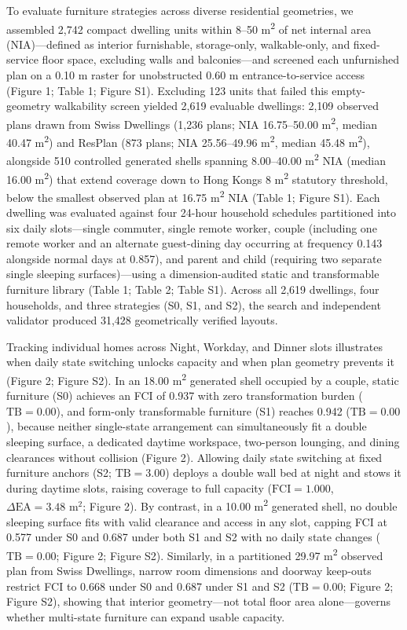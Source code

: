 \documentclass[12pt,letterpaper]{article}
\begin{document}
To evaluate furniture strategies across diverse residential geometries, we assembled 2,742 compact dwelling units within 8--50 m\textsuperscript{2} of net internal area (NIA)---defined as interior furnishable, storage-only, walkable-only, and fixed-service floor space, excluding walls and balconies---and screened each unfurnished plan on a 0.10 m raster for unobstructed 0.60 m entrance-to-service access (Figure 1; Table 1; Figure S1). Excluding 123 units that failed this empty-geometry walkability screen yielded 2,619 evaluable dwellings: 2,109 observed plans drawn from Swiss Dwellings (1,236 plans; NIA 16.75--50.00 m\textsuperscript{2}, median 40.47 m\textsuperscript{2}) and ResPlan (873 plans; NIA 25.56--49.96 m\textsuperscript{2}, median 45.48 m\textsuperscript{2}), alongside 510 controlled generated shells spanning 8.00--40.00 m\textsuperscript{2} NIA (median 16.00 m\textsuperscript{2}) that extend coverage down to Hong Kong\textquotesingle s 8 m\textsuperscript{2} statutory threshold, below the smallest observed plan at 16.75 m\textsuperscript{2} NIA (Table 1; Figure S1). Each dwelling was evaluated against four 24-hour household schedules partitioned into six daily slots---single commuter, single remote worker, couple (including one remote worker and an alternate guest-dining day occurring at frequency 0.143 alongside normal days at 0.857), and parent and child (requiring two separate single sleeping surfaces)---using a dimension-audited static and transformable furniture library (Table 1; Table 2; Table S1). Across all 2,619 dwellings, four households, and three strategies (S0, S1, and S2), the search and independent validator produced 31,428 geometrically verified layouts.

Tracking individual homes across Night, Workday, and Dinner slots illustrates when daily state switching unlocks capacity and when plan geometry prevents it (Figure 2; Figure S2). In an 18.00 m\textsuperscript{2} generated shell occupied by a couple, static furniture (S0) achieves an FCI of 0.937 with zero transformation burden (\(\text{TB} = 0.00\)), and form-only transformable furniture (S1) reaches 0.942 (\(\text{TB} = 0.00\)), because neither single-state arrangement can simultaneously fit a double sleeping surface, a dedicated daytime workspace, two-person lounging, and dining clearances without collision (Figure 2). Allowing daily state switching at fixed furniture anchors (S2; \(\text{TB} = 3.00\)) deploys a double wall bed at night and stows it during daytime slots, raising coverage to full capacity (\(\text{FCI} = 1.000\), \(\Delta\text{EA} = 3.48\text{ m}^2\); Figure 2). By contrast, in a 10.00 m\textsuperscript{2} generated shell, no double sleeping surface fits with valid clearance and access in any slot, capping FCI at 0.577 under S0 and 0.687 under both S1 and S2 with no daily state changes (\(\text{TB} = 0.00\); Figure 2; Figure S2). Similarly, in a partitioned 29.97 m\textsuperscript{2} observed plan from Swiss Dwellings, narrow room dimensions and doorway keep-outs restrict FCI to 0.668 under S0 and 0.687 under S1 and S2 (\(\text{TB} = 0.00\); Figure 2; Figure S2), showing that interior geometry---not total floor area alone---governs whether multi-state furniture can expand usable capacity.
\end{document}
